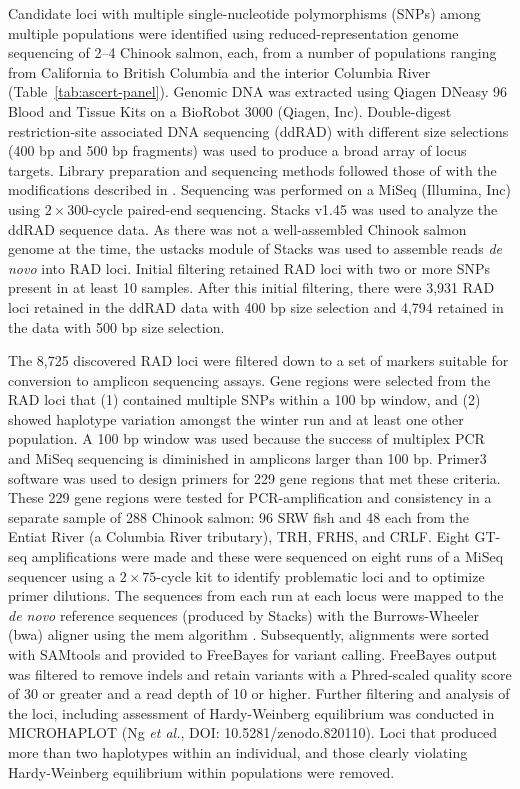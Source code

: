 Candidate loci with multiple single-nucleotide polymorphisms (SNPs) among multiple
populations were identified using reduced-representation genome sequencing of 2--4 Chinook salmon, each, from a number of
populations ranging from California to British
Columbia and the interior Columbia River (Table~\ref{tab:ascert-panel}).
Genomic DNA was extracted using Qiagen DNeasy 96 Blood and Tissue Kits on a BioRobot 3000
(Qiagen, Inc). Double-digest restriction-site associated DNA sequencing (ddRAD) with different size selections (400 bp and 500 bp
fragments) was used to produce a broad array of locus targets. Library preparation and sequencing methods followed those of
\citet{peterson2012double} with the modifications described in \citet{baetscher2018microhaplotypes}.
Sequencing was performed on a MiSeq (Illumina, Inc) using $2 \times 300$-cycle paired-end sequencing.
Stacks v1.45 \citep{catchen2013stacks} was used to analyze the ddRAD sequence data.  As there was not a well-assembled Chinook salmon genome
at the time, the ustacks module of Stacks was used to assemble reads {\em de novo} into RAD loci.  Initial filtering retained RAD loci with two or more SNPs present
in at least 10 samples. After this initial filtering, there were 3,931 RAD loci retained in the ddRAD data with 400 bp size selection and
4,794 retained in the data with 500 bp size selection.

The 8,725 discovered RAD loci were filtered down to a set of markers suitable for conversion
to amplicon sequencing assays. Gene regions were selected from the RAD loci that (1) contained multiple SNPs within a 100 bp window,
and (2) showed haplotype variation amongst the winter run and at least one other population.
A 100 bp window was used because the success of multiplex PCR and MiSeq sequencing is
diminished in amplicons larger than 100 bp. Primer3
software \citep{untergasser2012primer3} was used to design primers for 229 gene regions that met these criteria.
These 229 gene regions were tested for PCR-amplification and consistency in a separate sample
of 288 Chinook salmon: 96 SRW fish and 48 each from the Entiat River (a Columbia River
tributary), TRH, FRHS, and CRLF\@.  Eight GT-seq amplifications were made and these were sequenced
on eight runs of a MiSeq sequencer
using a $2\times 75$-cycle kit to identify problematic loci and to optimize primer dilutions.
The sequences from each run at each locus were mapped to the {\em de novo} reference sequences (produced by Stacks) with
the Burrows-Wheeler (bwa) aligner using the mem algorithm \citep{bwa-mem2009}. 
Subsequently, alignments were sorted with SAMtools \citep{li2009sequence} and provided to
FreeBayes \citep{garrison2012haplotype} for variant calling.
FreeBayes output was filtered to remove indels and retain variants with a Phred-scaled quality score of 30
or greater and a read depth of 10 or higher. Further filtering and analysis of the loci, including
assessment of Hardy-Weinberg equilibrium \citep{hardy1908mendelian} was conducted in MICROHAPLOT (Ng {\em et al.}, DOI: 10.5281/zenodo.820110).  Loci that produced more than two haplotypes within an individual, and those clearly violating Hardy-Weinberg equilibrium within populations were removed.


